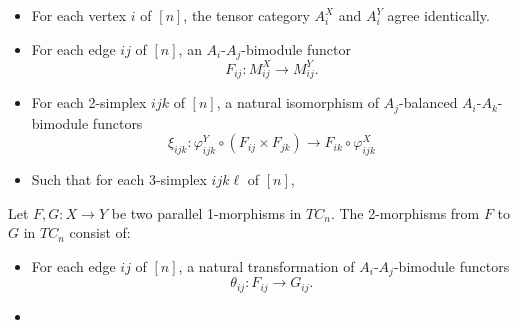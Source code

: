\documentclass{amsart}
\begin{document}
\begin{itemize}
	\item For each vertex $i$ of $[n]$, the tensor category $A_i^X$ and $A^Y_i$ agree identically. 
	\item For each edge $ij$ of $[n]$, an $A_i$-$A_j$-bimodule functor 
	\begin{equation*}
		F_{ij}: M_{ij}^X \to M_{ij}^Y.
	\end{equation*}
	\item For each 2-simplex $ijk$ of $[n]$, a natural isomorphism of $A_j$-balanced $A_i$-$A_k$-bimodule functors
	\begin{equation*}
		\xi_{ijk}: \varphi_{ijk}^Y \circ (F_{ij} \times F_{jk}) \to F_{ik} \circ \varphi_{ijk}^X
	\end{equation*}
	\item Such that for each 3-simplex $ijk\ell$ of $[n]$,
\end{itemize} 
Let $F,G: X \to Y$ be two parallel 1-morphisms in $TC_n$. The 2-morphisms from $F$ to $G$ in $TC_n$ consist of:
\begin{itemize}
	\item For each edge $ij$ of $[n]$, a natural transformation of $A_i$-$A_j$-bimodule functors
	\begin{equation*}
		\theta_{ij}: F_{ij} \to G_{ij}.
	\end{equation*}
	\item 
\end{itemize}





%
\end{document}
